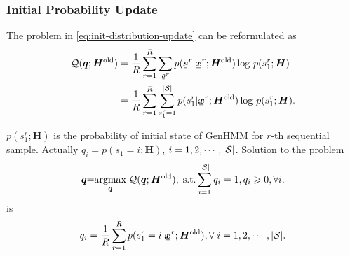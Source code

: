 \documentclass[letterpaper]{article} %
\newcommand{\ubar}[1]{\mkern2mu\underline{\mkern-2mu #1\mkern-2mu}\mkern2mu}
\newcommand{\ubmr}[2]{\ubar{\bm{#1}}^{#2}}
\newcommand{\smtr}[3]{{#1}^{#3}_{#2}}
\begin{document}
\subsubsection{Initial Probability Update}
The problem in \eqref{eq:init-distribution-update} can be reformulated as
\begin{align}
  \Qq(\bm{q}; \bm{H}^{\mathrm{old}})
  &=\frac{1}{R} \sum_{r=1}^{R}\sum_{\ubmr{s}{r}} {p(\ubmr{s}{r}| \ubmr{x}{r}; \bm{H}^{\mathrm{old}})} \log\,p(\smtr{s}{1}{r};\bm{H}) \nonumber \\
  & = \frac{1}{R}\sum_{r=1}^{R}\sum_{\smtr{s}{1}{r}=1}^{|\Ss|}{p(\smtr{s}{1}{r}| \ubmr{x}{r}; \bm{H}^{\mathrm{old}})} \log\,p(\smtr{s}{1}{r};\bm{H}).
\end{align}

$p(\smtr{s}{1}{r};\bm{H})$ is the probability of initial state of GenHMM for $r$-th sequential sample. Actually $q_i = p({s}_{1} =i;\bm{H}) $, $i= 1, 2, \cdots, |\mathcal{S}|$. Solution to the problem
\begin{align}
  \bm{q} \hspace{-0.1cm} = \hspace{-0.1cm} \uargmax{\bm{q}} \Qq(\bm{q}; \bm{H}^{\mathrm{old}}),\; \mathrm{s.t.} \sum_{i=1}^{ |\Ss| }q_i = 1, q_i \geq 0, \forall i.
\end{align}
is
\begin{equation}\label{eq:update-initial-state-prob}
  q_i = \frac{1}{R} \sum_{r=1}^{R} p(\smtr{s}{1}{r}=i | \ubmr{x}{r}; \bm{H}^{\mathrm{old}}), \forall\; i = 1, 2, \cdots, |\Ss|.
\end{equation}
\end{document}

